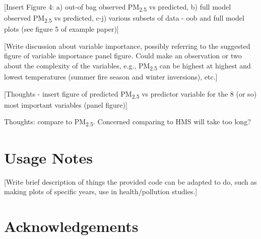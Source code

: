\documentclass[english]{article}
\begin{document}
[Insert Figure 4: a) out-of bag observed PM\textsubscript{2.5} vs predicted, b) full model observed PM\textsubscript{2.5} vs predicted, c-j) various subsets of data - oob and full model plots (see figure 5 of example paper)]

[Write discussion about variable importance, possibly referring to the suggested figure of variable importance panel figure. Could make an observation or two about the complexity of the variables, e.g., PM\textsubscript{2.5} can be highest at highest and lowest temperatures (summer fire season and winter inversions), etc.]

[Thoughts - insert figure of predicted PM\textsubscript{2.5} vs predictor variable for the 8 (or so) most important variables (panel figure)]

Thoughts: compare to PM\textsubscript{2.5}. Concerned comparing to HMS will take too long? 


\section*{Usage Notes}



[Write brief description of things the provided code can be adapted to do, such as making plots of specific years, use in health/pollution studies.]

\section*{Acknowledgements}

\end{document}
